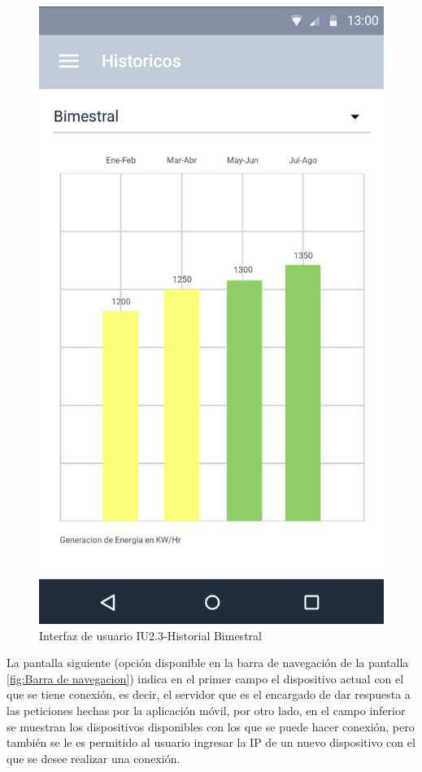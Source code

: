\begin{figure}[H]
	\centering
	\includegraphics[scale=0.70]{Capitulo4/software/submodulos/images/bimestral.png}
	\caption{Interfaz de usuario IU2.3-Historial Bimestral}
	\label{fig:Historial Bimestral}
\end{figure}

La pantalla siguiente (opción disponible en la barra de navegación de la pantalla \ref{fig:Barra de navegacion}) indica en el primer campo el dispositivo actual con el que se tiene conexión, es decir, el servidor que es el encargado de dar respuesta a las peticiones hechas por la aplicación móvil, por otro lado, en el campo inferior se muestran los dispositivos disponibles con los que se puede hacer conexión, pero también se le es permitido al usuario ingresar la IP de un nuevo dispositivo con el que se desee realizar una conexión.

